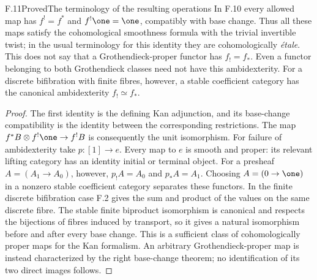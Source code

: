 \begin{claim}{F.11}{Proved}{The terminology of the resulting operations}
In F.10 every allowed map has $f^!=f^*$ and $f^!\one=\one$, compatibly with base change. Thus all these maps satisfy the cohomological smoothness formula with the trivial invertible twist; in the usual terminology for this identity they are cohomologically \emph{\'{e}tale}. This does not say that a Grothendieck-proper functor has $f_!=f_*$. Even a functor belonging to both Grothendieck classes need not have this ambidexterity. For a discrete bifibration with finite fibres, however, a stable coefficient category has the canonical ambidexterity $f_!\simeq f_*$.
\end{claim}
\begin{proof}
The first identity is the defining Kan adjunction, and its base-change compatibility is the identity between the corresponding restrictions. The map $f^*B\otimes f^!\one\to f^!B$ is consequently the unit isomorphism. For failure of ambidexterity take $p:[1]\to e$. Every map to $e$ is smooth and proper: its relevant lifting category has an identity initial or terminal object. For a presheaf $A=(A_1\to A_0)$, however, $p_!A=A_0$ and $p_*A=A_1$. Choosing $A=(0\to\one)$ in a nonzero stable coefficient category separates these functors. In the finite discrete bifibration case F.2 gives the sum and product of the values on the same discrete fibre. The stable finite biproduct isomorphism is canonical and respects the bijections of fibres induced by transport, so it gives a natural isomorphism before and after every base change. This is a sufficient class of cohomologically proper maps for the Kan formalism. An arbitrary Grothendieck-proper map is instead characterized by the right base-change theorem; no identification of its two direct images follows.
\end{proof}

